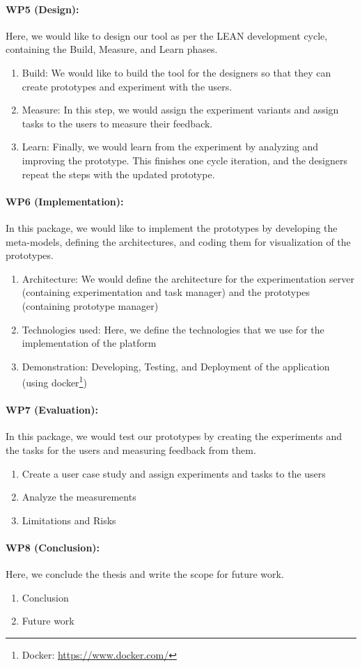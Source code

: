 \paragraph{WP5 (Design):} Here, we would like to design our tool as per the LEAN development cycle, containing the Build, Measure, and Learn phases.
\begin{enumerate}
    \item Build: We would like to build the tool for the designers so that they can create prototypes and experiment with the users.
    \item Measure: In this step, we would assign the experiment variants and assign tasks to the users to measure their feedback.
    \item Learn: Finally, we would learn from the experiment by analyzing and improving the prototype. This finishes one cycle iteration, and the designers repeat the steps with the updated prototype.
\end{enumerate}

\paragraph{WP6 (Implementation):} In this package, we would like to implement the prototypes by developing the meta-models, defining the architectures, and coding them for visualization of the prototypes.
\begin{enumerate}
    \item Architecture: We would define the architecture for the experimentation server (containing experimentation and task manager) and the prototypes (containing prototype manager)
    \item Technologies used: Here, we define the technologies that we use for the implementation of the platform 
    \item Demonstration: Developing, Testing, and Deployment of the application (using docker\footnote{Docker: \url{https://www.docker.com/}})
\end{enumerate}

\paragraph{WP7 (Evaluation):} In this package, we would test our prototypes by creating the experiments and the tasks for the users and measuring feedback from them.
\begin{enumerate}
    \item Create a user case study and assign experiments and tasks to the users 
    \item Analyze the measurements
    \item Limitations and Risks
\end{enumerate}

\paragraph{WP8 (Conclusion):} Here, we conclude the thesis and write the scope for future work.
\begin{enumerate}
    \item Conclusion
    \item Future work
\end{enumerate}

